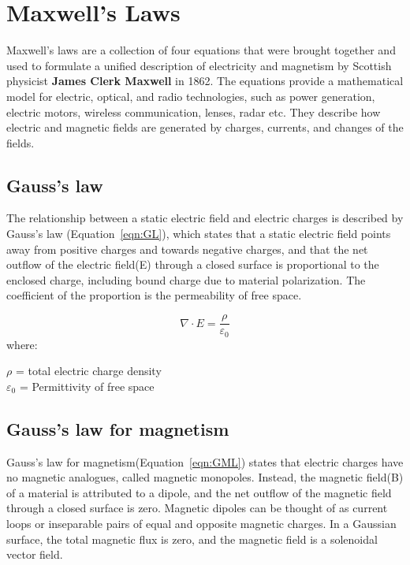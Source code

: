 \section{Maxwell's Laws}
Maxwell's laws are a collection of four equations that were brought together and used to formulate a unified description of electricity and magnetism by Scottish physicist \textbf{James Clerk Maxwell} in 1862. The equations provide a mathematical model for electric, optical, and radio technologies, such as power generation, electric motors, wireless communication, lenses, radar etc. They describe how electric and magnetic fields are generated by charges, currents, and changes of the fields.  


\subsection{Gauss's law}
The relationship between a static electric field and electric charges is described by Gauss's law (Equation~\ref{eqn:GL}), which states that a static electric field points away from positive charges and towards negative charges, and that the net outflow of the electric field({E}) through a closed surface is proportional to the enclosed charge, including bound charge due to material polarization. The coefficient of the proportion is the permeability of free space.

\begin{equation}
\label{eqn:GL}
{\nabla} \cdot {E} = \frac{\rho}{\varepsilon_0}
\end{equation}
where:
\begin{center}
${\rho}$ = total electric charge density\\
${\varepsilon_0}$ = Permittivity of free space\\
\end{center}

\subsection{Gauss's law for magnetism}
Gauss's law for magnetism(Equation~\ref{eqn:GML}) states that electric charges have no magnetic analogues, called magnetic monopoles. Instead, the magnetic field({B}) of a material is attributed to a dipole, and the net outflow of the magnetic field through a closed surface is zero. Magnetic dipoles can be thought of as current loops or inseparable pairs of equal and opposite magnetic charges. In a Gaussian surface, the total magnetic flux is zero, and the magnetic field is a solenoidal vector field. 

